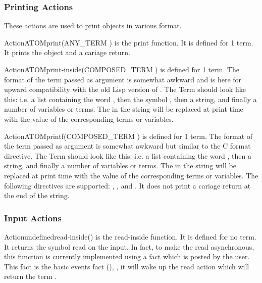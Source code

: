 \subsubsection{Printing Actions}

These actions are used to print objects in various format.

\begin{typeefa}{Action}{ATOM}{print}{(ANY\_TERM )} is the print
function. It is defined for 1 term. It prints the object and a cariage return.
\end{typeefa}

\begin{typeefa}{Action}{ATOM}{print-inside}{(COMPOSED\_TERM )}
is defined for 1 term. The format of the term passed as argument is somewhat
awkward and is here for upward compatibility with the old Lisp version of
\OPRS{}. The Term should look like this: \*
\*
i.e. a list containing the word , then the symbol
, then a string, and finally a number of variables or terms.
The  in the string will be replaced at print time with the value of
the corresponding terms or variables.
\end{typeefa}

\begin{typeefa}{Action}{ATOM}{printf}{(COMPOSED\_TERM )}
is defined for 1 term. The format of the term passed as argument is somewhat
awkward but similar to the C format directive. 
The Term should look like this: \*
\*
i.e. a list containing the word , then a string, and finally a
number of variables or terms.  The  in the string will be replaced at
print time with the value of the corresponding terms or variables. The
following directives are supported: , ,  and
. It does not print a cariage return at the end of the string.
\end{typeefa}

\subsubsection{Input Actions}

\begin{typeefa}{Action}{undefined}{read-inside}{()}
is the read-inside function. It is defined for no term. It returns the
symbol read on the input. In fact, to make the read asynchronous, this
function is currently implemented using a fact which is posted by the
user.  This fact is the basic events fact (),
, it will wake up the read action which
will return the term .
\end{typeefa}

